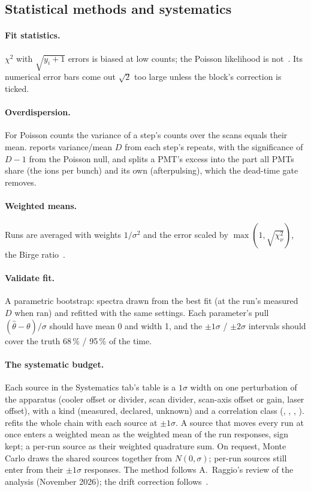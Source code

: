 \subsection{Statistical methods and systematics}

\paragraph{Fit statistics.} $\chi^2$ with $\sqrt{y_i+1}$ errors is
biased at low counts; the Poisson likelihood is not~\cite{baker1984}.
Its numerical error bars come out $\sqrt{2}$ too large unless the
 block's correction is ticked.

\paragraph{Overdispersion.} For Poisson counts the variance of a step's
counts over the scans equals their mean.  reports
variance/mean $D$ from each step's repeats, with the significance of
$D-1$ from the Poisson null, and splits a PMT's excess into the part all
PMTs share (the ions per bunch) and its own (afterpulsing), which the
dead-time gate removes.

\paragraph{Weighted means.} Runs are averaged with weights $1/\sigma^2$
and the error scaled by $\max(1, \sqrt{\chi^2_\nu})$, the Birge
ratio~\cite{birge1932}.

\paragraph{Validate fit.} A parametric bootstrap: spectra drawn from the
best fit (at the run's measured $D$ when  ran) and
refitted with the same settings. Each parameter's pull
$(\hat\theta-\theta)/\sigma$ should have mean 0 and width 1, and the
$\pm1\sigma$ / $\pm2\sigma$ intervals should cover the truth 68\,\% /
95\,\% of the time.

\paragraph{The systematic budget.} Each source in the Systematics tab's
 table is a $1\sigma$ width on one perturbation of the
apparatus (cooler offset or divider, scan divider, scan-axis offset or
gain, laser offset), with a kind (measured, declared, unknown) and a
correlation class (, , ,
).  refits the whole chain with each
source at $\pm1\sigma$. A source that moves every run at once enters a
weighted mean as the weighted mean of the run responses, sign kept; a
per-run source as their weighted quadrature sum. On request, Monte Carlo
draws the shared sources together from $N(0,\sigma)$; per-run sources
still enter from their $\pm1\sigma$ responses. The method follows
A.~Raggio's review of the analysis (November 2026); the drift correction
follows~\cite{vandenborne2025}.

